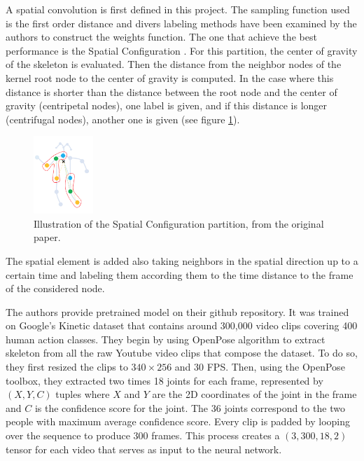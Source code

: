 \documentclass[12pt,a4paper,twoside]{article}
\begin{document}
A spatial convolution is first defined in this project. The sampling function used is the first order distance and divers labeling methods have been examined by the authors to construct the weights function. The one that achieve the best performance is the \guillemotleft Spatial Configuration \guillemotright. For this partition, the center of gravity of the skeleton is evaluated. Then the distance from the neighbor nodes of the kernel root node to the center of gravity is computed. In the case where this distance is shorter than the distance between the root node and the center of gravity (centripetal nodes), one label is given, and if this distance is longer (centrifugal nodes), another one is given (see figure \ref{fig:partition_strat}).

\begin{figure}
    \centering
        \includegraphics[width=0.2\textwidth]{images/partition_strat}
    \caption{Illustration of the Spatial Configuration partition, from the original paper.}
    \label{fig:partition_strat}
\end{figure}

The spatial element is added also taking neighbors in the spatial direction up to a certain time and labeling them according them to the time distance to the frame of the considered node.

The authors provide pretrained model on their github repository. It was trained on Google's Kinetic dataset that contains around 300,000 video clips covering 400 human action classes. They begin by using OpenPose algorithm to extract skeleton from all the raw Youtube video clips that compose the dataset. To do so, they first resized the clips to $340 \times 256$ and $30$ FPS. Then, using the OpenPose toolbox, they extracted two times 18 joints for each frame, represented by $(X,Y,C)$ tuples where $X$ and $Y$ are the 2D coordinates of the joint in the frame and $C$ is the confidence score for the joint. The 36 joints correspond to the two people with maximum average confidence score. Every clip is padded by looping over the sequence to produce 300 frames. This process creates a $(3, 300, 18, 2)$ tensor for each video that serves as input to the neural network. 
\end{document}
